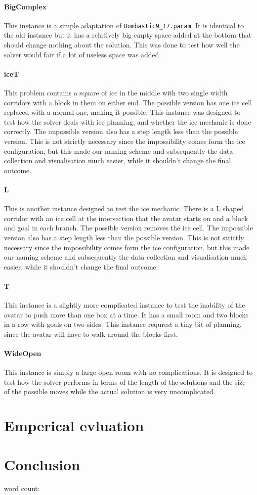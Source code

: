 \documentclass[british]{article}
\newcommand{\code}[1]{\texttt{#1}}
\begin{document}
	\paragraph{BigComplex} This instance is a simple adaptation of \code{Bombastic9\_17.param}.  It is identical to the old instance but it has a relatively big empty space added at the bottom that should change nothing about the solution. This was done to test how well the solver would fair if a lot of useless space was added. 
	\paragraph{iceT} This problem contains a square of ice in the middle with two single width corridors with a block in them on either end. The possible version has one ice cell replaced with a normal one, making it possible. This instance was designed to test how the solver deals with ice planning, and whether the ice mechanic is done correctly. The impossible version also has a step length less than the possible version. This is not strictly necessary since the impossibility comes form the ice configuration, but this made our naming scheme and subsequently the data collection and visualisation much easier, while it shouldn't change the final outcome. 
	\paragraph{L} This is another instance designed to test the ice mechanic. There is a L shaped corridor with an ice cell at the intersection that the avatar starts on and a block and goal in each branch. The possible version removes the ice cell. The impossible version also has a step length less than the possible version. This is not strictly necessary since the impossibility comes form the ice configuration, but this made our naming scheme and subsequently the data collection and visualisation much easier, while it shouldn't change the final outcome.  
	\paragraph{T} This instance is a slightly more complicated instance to test the inability of the avatar to push more than one box at a time. It has a small room and two blocks in a row with goals on two sides. This instance requrest a tiny bit of planning, since the avatar will have to walk around the blocks first. 
	\paragraph{WideOpen} This instance is simply a large open room with no complications. It is designed to test how the solver performs in terms of the length of the solutions and the size of the possible moves while the actual solution is very uncomplicated. 

\section{Emperical evluation}
\label{results}

\section{Conclusion}
\label{conclusion}

 
 
 
word count: 
\printbibliography
\end{document}
